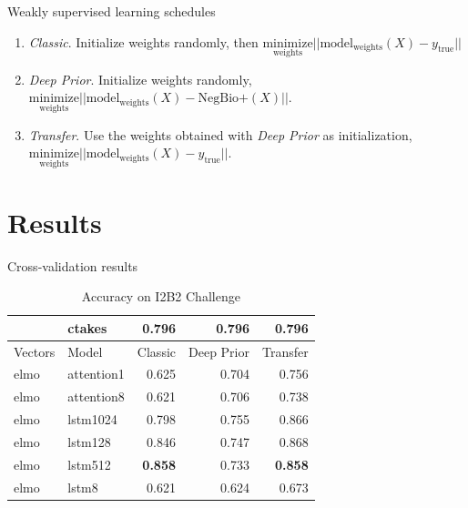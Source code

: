 \documentclass[pdf]{beamer}
\newcommand{\?}{\ensuremath{^\texttt{\bf [CITATION~NEEDED]}}}
\begin{document}
\begin{frame}{Weakly supervised learning schedules}

\begin{enumerate}
\item \emph{Classic}. Initialize weights randomly, then $\underset{\text{weights}}{\text{minimize}} ||\text{model}_{\text{weights}}(X) - y_{\text{true}}||$
\item \emph{Deep Prior}. Initialize weights randomly, $\underset{\text{weights}}{\text{minimize}} ||\text{model}_{\text{weights}}(X) - \text{NegBio+}(X)||$.
\item \emph{Transfer}. Use the weights obtained with \emph{Deep Prior} as initialization, $\underset{\text{weights}}{\text{minimize}} ||\text{model}_{\text{weights}}(X) - y_{\text{true}}||$.
\end{enumerate}

\end{frame}

\section{Results}
\label{sec:results}

\begin{frame}{Cross-validation results}

\begin{table}
\caption{Accuracy on I2B2 Challenge}
\label{i2b2-accuracy}
\begin{tabular}{llrrr}
\toprule
 & ctakes & 0.796  & 0.796 & 0.796  \\
\midrule
Vectors &      Model         &  Classic &  Deep Prior &  Transfer \\
\midrule
                   elmo &          attention1 &    0.625 &       0.704 &     0.756 \\
                   elmo &          attention8 &    0.621 &       0.706 &     0.738 \\
                   elmo &            lstm1024 &    0.798 &       0.755 &     0.866 \\
                   elmo &             lstm128 &    0.846 &       0.747 &     0.868 \\
                   elmo &             lstm512 &    \textbf{0.858} &       0.733 &     \textbf{0.858} \\
                   elmo &               lstm8 &    0.621 &       0.624 &     0.673 \\
\bottomrule
\end{tabular}
\end{table}

\end{frame}
\end{document}
